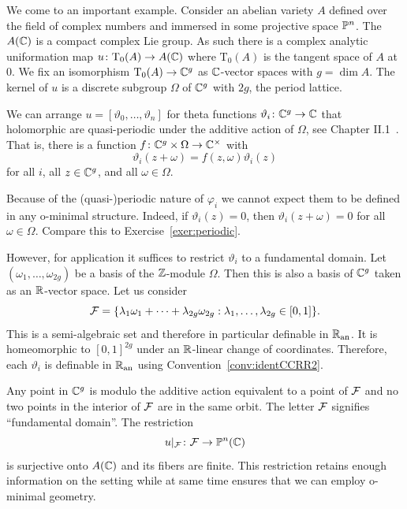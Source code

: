 \begin{example}
  \label{ex:thetafunc}
  We come to an important example. Consider an abelian variety $A$
  defined over the field of complex numbers and immersed in some
  projective space ${\mathbb{P}}^n$.
  The $A({\mathbb{C}})$ is a compact complex Lie group. As such there is a
  complex analytic uniformation map $u\colon \mathrm{T}_0(A) \rightarrow
  A({\mathbb{C}})$
  where $\mathrm{T}_0(A)$ is the tangent space of $A$ at $0$.
  We fix an isomorphism $\mathrm{T}_0(A)\rightarrow{\mathbb{C}}^g$ as
  ${\mathbb{C}}$-vector spaces with $g=\dim A$. The kernel of $u$ is a discrete
  subgroup $\Omega$ of ${\mathbb{C}}^g$ with  $2g$, the period lattice.

  We can arrange $u = [\vartheta_0,\ldots,\vartheta_n]$ for theta
  functions $\vartheta_i \colon {\mathbb{C}}^g \rightarrow{\mathbb{C}}$ that holomorphic
  are quasi-periodic  under the additive action of $\Omega$, see
  Chapter II.1~\cite{Mumford:theta1}. 
  That is, there is a function $f\colon {\mathbb{C}}^g\times \Omega\rightarrow
  {\mathbb{C}}^\times$ with 
  \begin{equation*}
    \vartheta_i(z+\omega) = f(z,\omega) \vartheta_i(z)
  \end{equation*}
  for all $i$, all $z\in{\mathbb{C}}^g$, and all $\omega\in\Omega$. 
  
  Because of the (quasi-)periodic nature of $\varphi_i$ we cannot
  expect them to be defined in any o-minimal structure. Indeed, if
  $\vartheta_i(z)=0$, then $\vartheta_i(z+\omega)=0$ for all
  $\omega\in\Omega$. Compare this to Exercise~\ref{exer:periodic}.
  
  However, for application it suffices to restrict $\vartheta_i$ to a
  fundamental domain. 
  Let $(\omega_1,\ldots,\omega_{2g})$ be a basis of the ${\mathbb{Z}}$-module
  $\Omega$. Then this is also a basis of ${\mathbb{C}}^{g}$ taken as an
  ${\mathbb{R}}$-vector space. Let us consider
  $$ {\mathcal F} = \{\lambda_1\omega_1+\cdots+\lambda_{2g}\omega_{2g} :
  \lambda_1,\ldots,\lambda_{2g}\in [0,1]\}.$$
  This is a semi-algebraic set and therefore in particular definable
  in ${{\mathbb{R}}_{\mathrm{an}}}$. It is homeomorphic to $[0,1]^{2g}$
  under an ${\mathbb{R}}$-linear change of coordinates.
  Therefore, each $\vartheta_i$ is definable in ${{\mathbb{R}}_{\mathrm{an}}}$ using
  Convention~\ref{conv:identCCRR2}. 
  
  Any point in ${\mathbb{C}}^g$ is modulo the additive action
  equivalent to a point of ${\mathcal F}$ and no two points in the interior of ${\mathcal F}$
  are in the same orbit. The letter ${\mathcal F}$ signifies ``fundamental
  domain''. 
  The restriction
  \begin{equation*}
    u|_{{\mathcal F}} \colon {\mathcal F}\rightarrow {\mathbb{P}}^n({\mathbb{C}})
  \end{equation*}
  is surjective onto $A({\mathbb{C}})$ and its fibers are finite.
  This restriction retains enough information on the setting while at
  same time
  ensures that we can employ o-minimal geometry. 


\end{example}
